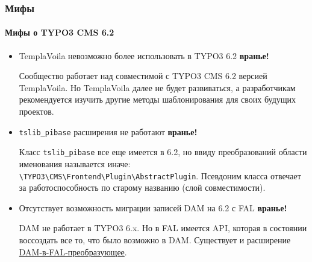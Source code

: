 \begin{frame}[fragile]
	\frametitle{Мифы}
	\framesubtitle{Мифы о TYPO3 CMS 6.2}

	\begin{itemize}
		\item TemplaVoila невозможно более использовать в TYPO3 6.2
			\tabto{9cm}\color{red}\textbf{\textrightarrow вранье!}\color{black}

			\smaller
				Сообщество работает над совместимой с TYPO3 CMS 6.2 версией TemplaVoila. Но TemplaVoila далее не будет развиваться, а разработчикам рекомендуется изучить другие методы шаблонирования для своих будущих проектов.
			\normalsize

		\item \texttt{tslib\_pibase} расширения не работают
			\tabto{9cm}\color{red}\textbf{\textrightarrow вранье!}\color{black}

			\smaller
				Класс \texttt{tslib\_pibase} все еще имеется в 6.2, но ввиду преобразований области именования называется иначе: \texttt{\textbackslash TYPO3\textbackslash CMS\textbackslash Frontend\textbackslash Plugin\textbackslash AbstractPlugin}.\newline
				Псевдоним класса отвечает за работоспособность по старому названию (слой совместимости).
			\normalsize

		\item Отсутствует возможность миграции записей DAM на 6.2 с FAL
			\tabto{9cm}\color{red}\textbf{\textrightarrow вранье!}\color{black}

			\smaller
				DAM не работает в TYPO3 6.x. Но в FAL имеется API, которая в состоянии воссоздать все то,
				что было возможно в DAM. Существует и расширение \href{https://github.com/fnagel/t3ext-dam_falmigration}{DAM-в-FAL-преобразующее}.
			\normalsize

	\end{itemize}

\end{frame}


